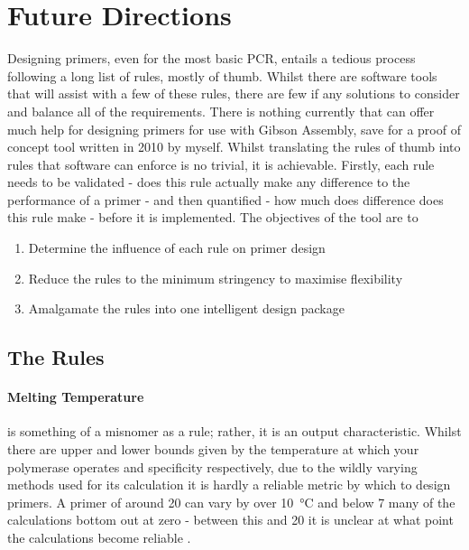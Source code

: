 \documentclass[../main.tex]{subfiles}
\begin{document}
\section{Future Directions}

Designing primers, even for the most basic PCR, entails a tedious process following a long list of rules, mostly of thumb. Whilst there are software tools that will assist with a few of these rules, there are few if any solutions to consider and balance all of the requirements. There is nothing currently that can offer much help for designing primers for use with Gibson Assembly, save for a proof of concept tool written in 2010 by myself. Whilst translating the rules of thumb into rules that software can enforce is no trivial, it is achievable. Firstly, each rule needs to be validated - does this rule actually make any difference to the performance of a primer - and then quantified - how much does difference does this rule make - before it is implemented. The objectives of the tool are to 
\begin{enumerate}
\item{Determine the influence of each rule on primer design}
\item{Reduce the rules to the minimum stringency to maximise flexibility}
\item{Amalgamate the rules into one intelligent design package}
\end{enumerate}

\subsection{The Rules}

\paragraph{Melting Temperature} is something of a misnomer as a rule; rather, it is an output characteristic. Whilst there are upper and lower bounds given by the temperature at which your polymerase operates and specificity respectively, due to the wildly varying methods used for its calculation it is hardly a reliable metric by which to design primers. A primer of around \SI{20}{\base} can vary by over \SI{10}{\degreeCelsius} and below \SI{7}{\base} many of the calculations bottom out at zero - between this and \SI{20}{\base} it is unclear at what point the calculations become reliable .
\end{document}
